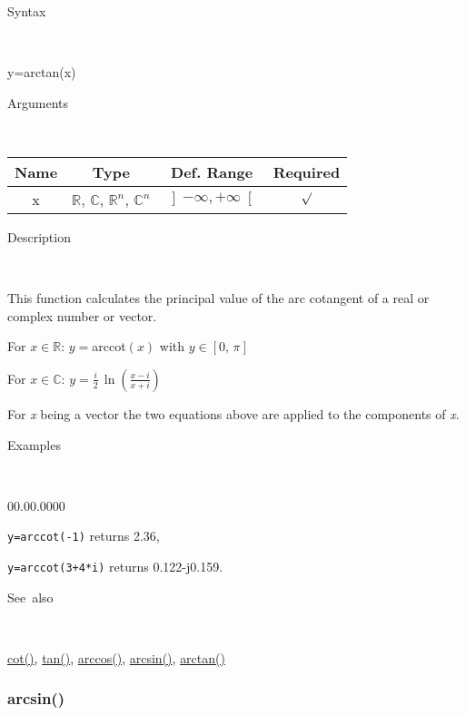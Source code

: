\begin{description}
\item [Syntax]~
\end{description}
y=arctan(x)

\begin{description}
\item [Arguments]~
\end{description}
\begin{tabular}{|c|c|c|c|}
\hline 
Name&
Type&
Def. Range&
Required\tabularnewline
\hline
\hline 
x&
$\mathbb{R}$, $\mathbb{C}$, $\mathbb{R}^{n}$, $\mathbb{C}^{n}$&
$\left]-\infty,+\infty\right[$&
$\surd$\tabularnewline
\hline
\end{tabular}

\begin{description}
\item [Description]~
\end{description}
This function calculates the principal value of the arc cotangent
of a real or complex number or vector.

\medskip{}
For $x\in\mathbb{R}$: $y=$arccot$\left(x\right)$ with $y\in\left[0,\,\pi\right]$

\medskip{}
For $x\in\mathbb{C}$: $y=$${\displaystyle \frac{i}{2}\,\ln\left(\frac{x-i}{x+i}\right)}$
\medskip{}

\noindent For \textit{x} being a vector the two equations above are
applied to the components of \textit{x}.

\begin{description}
\item [Examples]~
\end{description}
\begin{lyxlist}{00.00.0000}
\item [\texttt{y=arccot(-1)}]returns 2.36,
\item [\texttt{y=arccot(3+4{*}i)}]returns 0.122-j0.159.
\end{lyxlist}
\begin{description}
\item [See~also]~
\end{description}
\textcolor{blue}{\hyperlink{cot}{cot()}}\textcolor{black}{,} \textcolor{blue}{\hyperlink{tan}{tan()}}\textcolor{black}{,}
\textcolor{blue}{\hyperlink{arccos}{arccos()}}\textcolor{black}{,}
\textcolor{blue}{\hyperlink{arcsin}{arcsin()}}\textcolor{black}{,}
\textcolor{blue}{\hyperlink{arctan}{arctan()}}


\newpage
\subsubsection*{\hypertarget{arcsin}{}{\Large arcsin()}}


